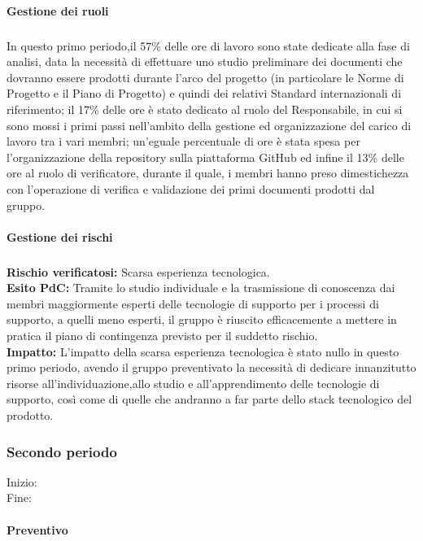 \paragraph{Gestione dei ruoli} 
\subparagraph{}
In questo primo periodo,il 57\% delle ore di lavoro sono state dedicate alla fase di analisi,
data la necessità di effettuare uno studio preliminare dei documenti che dovranno essere prodotti durante
l'arco del progetto (in particolare le Norme di Progetto e il Piano di Progetto) e quindi dei relativi Standard
internazionali di riferimento; il 17\% delle ore è stato dedicato al ruolo del Responsabile, in cui si sono mossi i primi 
passi nell'ambito della gestione ed organizzazione del carico di lavoro tra i vari membri; un'eguale percentuale di ore 
è stata spesa per l'organizzazione della repository sulla piattaforma GitHub ed infine il 13\% delle ore al ruolo di verificatore,
durante il quale, i membri hanno preso dimestichezza con l'operazione di verifica e validazione dei primi documenti prodotti dal gruppo.

\paragraph{Gestione dei rischi}
\subparagraph{} 
\textbf{Rischio verificatosi:} Scarsa esperienza tecnologica. \\
\textbf{Esito PdC:} Tramite lo studio individuale e la trasmissione di conoscenza dai membri maggiormente esperti delle tecnologie di supporto
per i processi di supporto, a quelli meno esperti, il gruppo è riuscito efficacemente a mettere in pratica il piano di contingenza previsto per il suddetto
rischio.\\
\textbf{Impatto:} L'impatto della scarsa esperienza tecnologica è stato nullo in questo primo periodo,
avendo il gruppo preventivato la necessità di dedicare innanzitutto risorse all'individuazione,allo studio e all'apprendimento
delle tecnologie di supporto, così come di quelle che andranno a far parte dello stack tecnologico del prodotto.\\ 

\subsubsection{Secondo periodo} 
Inizio: \\
Fine:
\paragraph{Preventivo}
\subparagraph{}

